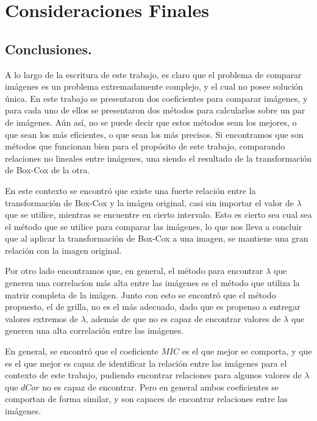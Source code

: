 \chapter{Consideraciones Finales}\label{chap6}

\section{Conclusiones.}


    A lo largo de la escritura de este trabajo, es claro que el problema de comparar im\'agenes es un problema extremadamente complejo, y el cual no posee soluci\'on \'unica. En este trabajo se presentaron dos coeficientes para comparar im\'agenes, y para cada uno de ellos se presentaron dos m\'etodos para calcularlos sobre un par de im\'agenes. A\'un as\'i, no se puede decir que estos m\'etodos sean los mejores, o que sean los m\'as eficientes, o que sean los m\'as precisos. Si encontramos que son m\'etodos que funcionan bien para el prop\'osito de este trabajo, comparando relaciones no lineales entre im\'agenes, una siendo el resultado de la transformaci\'on de Box-Cox de la otra.

    En este contexto se encontr\'o que existe una fuerte relaci\'on entre la transformaci\'on de Box-Cox y la im\'agen original, casi sin importar el valor de $\lambda$ que se utilice, mientras se encuentre en cierto intervalo. Esto es cierto sea cual sea el m\'etodo que se utilice para comparar las im\'agenes, lo que nos lleva a concluir que al aplicar la transformaci\'on de Box-Cox a una imagen, se mantiene una gran relaci\'on con la imagen original.

    Por otro lado encontramos que, en general, el m\'etodo para encontrar $\lambda$ que generen una correlac\'ion m\'as alta entre las im\'agenes es el m\'etodo que utiliza la matriz completa de la im\'agen. Junto con esto se encontr\'o que el m\'etodo propuesto, el de grilla, no es el m\'as adecuado, dado que es propenso a entregar valores extremos de $\lambda$, además de que no es capaz de encontrar valores de $\lambda$ que generen una alta correlaci\'on entre las im\'agenes.

    En general, se encontr\'o que el coeficiente $MIC$ es el que mejor se comporta, y que es el que mejor es capaz de identificar la relaci\'on entre las im\'agenes para el contexto de este trabajo, pudiendo encontrar relaciones para algunos valores de $\lambda$ que $dCor$ no es capaz de encontrar. Pero en general ambos coeficientes se comportan de forma similar, y son capaces de encontrar relaciones entre las im\'agenes.


